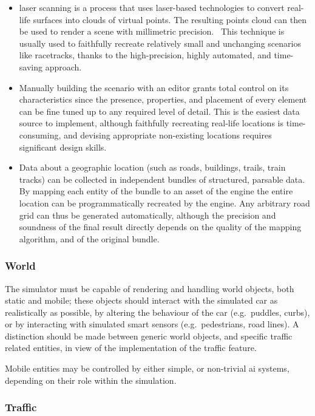 \begin{itemize}
	\item {} laser scanning is a process that uses laser-based technologies to convert real-life surfaces into clouds of virtual points. The resulting  points cloud can then be used to render a scene with millimetric precision.~\cite{feasibility:laserscanning} This technique is usually used to faithfully recreate relatively small and unchanging scenarios like racetracks, thanks to the high-precision, highly automated, and time-saving approach.
    \item Manually building the scenario with an editor grants total control on its characteristics since the presence, properties, and placement of every element can be fine tuned up to any required level of detail. This is the easiest data source to implement, although faithfully recreating real-life locations is time-consuming, and devising appropriate non-existing locations requires significant design skills.
    \item Data about a geographic location (such as roads, buildings, trails, train tracks) can be collected in independent bundles of structured, parsable data. By mapping each entity of the bundle to an asset of the engine the entire location can be programmatically recreated by the engine. Any arbitrary road grid can thus be generated automatically, although the precision and soundness of the final result directly depends on the quality of the mapping algorithm, and of the original bundle.
\end{itemize}

\subsubsection{World}

The simulator must be capable of rendering and handling world objects, both static and mobile; these objects should interact with the simulated car as realistically as possible, by altering the behaviour of the car (e.g.\ puddles, curbs), or by interacting with simulated smart sensors (e.g.\ pedestrians, road lines). A distinction should be made between generic world objects, and specific traffic related entities, in view of the implementation of the traffic \gls{feature}.

Mobile entities may be controlled by either simple, or non-trivial \gls{ai} systems, depending on their role within the simulation.

\subsubsection{Traffic}

